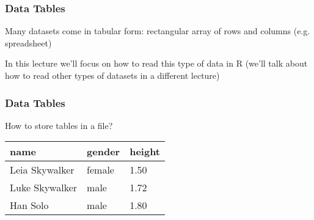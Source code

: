 \documentclass[12pt]{beamer}\usepackage[]{graphicx}\usepackage[]{color}
\begin{document}

\begin{frame}
\frametitle{Data Tables}

Many datasets come in tabular form: rectangular array of rows and columns (e.g. spreadsheet)

\begin{center}
\end{center}

{\small
In this lecture we'll focus on how to read this type of data in R (we'll talk about how to read other types of datasets in a different lecture)
}

\end{frame}


\begin{frame}[fragile]
\frametitle{Data Tables}

\begin{center}
{\Large How to store tables in a file?}

\bigskip

 \begin{tabular}{| l | l | l |}
  \hline
name & gender & height \\
  \hline
Leia Skywalker & female & 1.50 \\
  \hline
Luke Skywalker & male & 1.72 \\
  \hline
Han Solo & male & 1.80 \\
  \hline
 \end{tabular}
\end{center}

\end{frame}


\begin{frame}
\begin{center}
\Huge{}
\end{center}
\end{frame}


\begin{frame}[fragile]
\frametitle{}
\begin{center}
\end{center}
\end{frame}
\end{document}
